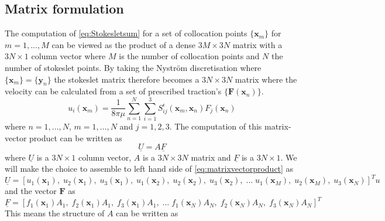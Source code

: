 \subsection{Matrix formulation} \label{subsec:MatrixForm}
The computation of \cref{eq:Stokesletsum} for a set of collocation points $\{\bm{x}_m\}$  for $m = 1,...,M$ can be viewed as the product of a dense $3M \times 3N$ matrix with a $3N \times 1$ column vector where $M$ is the number of collocation points and $N$ the number of stokeslet points. By taking the Nyström \cite{Nystrom1930UberRandwertaufgaben} discretisation where $\{\bm{x}_m\} = \{\bm{y}_n\}$ the stokeslet matrix therefore becomes a $3N \times 3N$ matrix where the velocity can be calculated from a set of prescribed traction's $\{\bm{F}(\bm{x}_n)\}$. 
\begin{equation}
\label{eq:Nystrom}
    u_{i}\left(\bm{x}_m\right)=\frac{1}{8 \pi \mu} \sum_{n=1}^{N} \sum_{i=1}^{3} S_{i j}^{\epsilon}\left(\bm{x}_m, {\bm{x}}_{n}\right) {F}_{j}({\bm{x}}_{n})
\end{equation}
where $n=1,\dots,N$, $m=1,\dots,N$ and $j=1,2,3$. The computation of this matrix-vector product can be written as 
\begin{equation}
\label{eq:matrixvectorproduct}
    \underline{U} = A \underline{F}
\end{equation}
where $\underline{U}$ is a $3N \times 1$ column vector, $A$ is a $3N \times 3N$ matrix and $\underline{F}$ is a $3N \times 1$. We will make the choice to assemble to left hand side of \cref{eq:matrixvectorproduct} as
\small
\begin{equation*}
    \underline{U} = [u_1({\bm{x}}_{1}), \; u_2({\bm{x}}_{1}), \; u_3({\bm{x}}_{1}), \; u_1({\bm{x}}_{2}), \; u_2({\bm{x}}_{2}), \; u_3({\bm{x}}_{2}), \; \dots \; u_1({\bm{x}}_{M}), \; u_2({\bm{x}}_{M}), \; u_3({\bm{x}}_{N})]^{T}u
\end{equation*}
\normalsize
and the vector $\bm{F}$ as
\small
\begin{equation*}
    \underline{F} = [{f}_{1}({\bm{x}}_{1})A_1, \; {f}_{2}({\bm{x}}_{1})A_1, \; {f}_{3}({\bm{x}}_{1})A_1,\; \dots \; {f}_{1}({\bm{x}}_{N})A_N, \; {f}_{2}({\bm{x}}_{N})A_N, \; f_{3}({\bm{x}}_{N})A_N]^{T}
\end{equation*}
\normalsize
This means the structure of $A$ can be written as
\small
